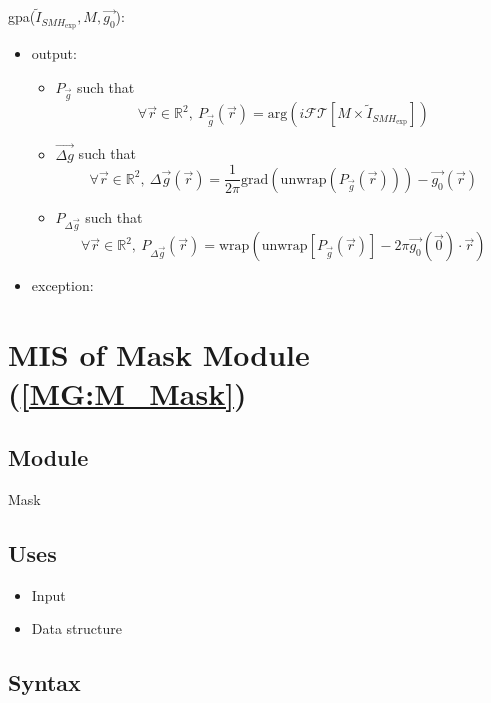\documentclass[12pt, titlepage]{article}
\begin{document}
\noindent gpa($\widetilde{I}_{\mathit{SMH}_{\text{exp}}},M,\overrightarrow{g_0}$):
\begin{itemize} 
\item output: 
\begin{itemize}
	\item $P_{\vec{g}}$ such that
	\begin{equation*}
	\forall \vec{r} \in \mathbb{R}^2, \ P_{\vec{g}}(\vec{r})=\text{arg}(i\mathcal{FT}[M\times\widetilde{I}_{\mathit{SMH}_{\text{exp}}}])
	\end{equation*}
	\item $\overrightarrow{\Delta g}$ such that
	\begin{equation*}
	\forall \vec{r} \in \mathbb{R}^2, \ \Delta \overrightarrow{g}(\vec{r})=\frac{1}{2\pi}\text{grad}(\text{unwrap}(P_{\vec{g}}(\vec{r})))-\overrightarrow{g_0}(\vec{r})
	\end{equation*}
	\item $P_{\Delta \vec{g}}$ such that
	\begin{equation*}
	\forall \vec{r} \in \mathbb{R}^2, \ P_{\Delta \vec{g}}(\vec{r})=\text{wrap}(\text{unwrap}[P_{\vec{g}}(\vec{r})]-2\pi\overrightarrow{g_0}(\vec{0})\cdot \vec{r})
	\end{equation*}
\end{itemize}
\item exception:  
\end{itemize}

\section{MIS of Mask Module (\texorpdfstring{\cref{MG:M_Mask}}))} \label{MIS_Mask}

\subsection{Module}
Mask
\subsection{Uses}
\begin{itemize}
\item Input
\item Data structure
\end{itemize}

\subsection{Syntax}
\end{document}
